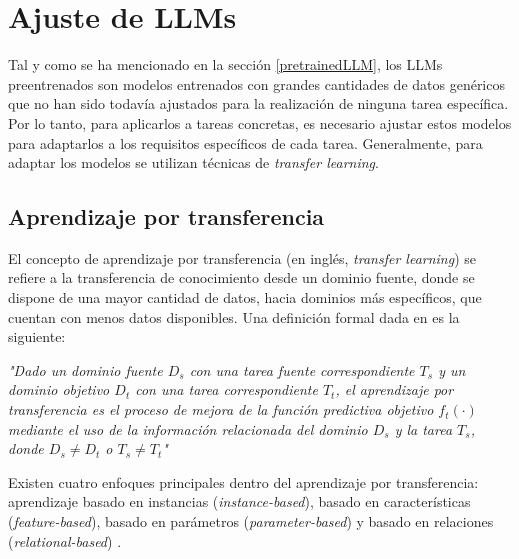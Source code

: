 \documentclass[11pt,spanish,listoffigures,listoftables]{tfgetsinf}
\begin{document}
\section{Ajuste de LLMs}

Tal y como se ha mencionado en la sección \ref{pretrainedLLM}, los LLMs preentrenados son modelos entrenados con grandes cantidades de datos genéricos que no han sido todavía ajustados para la realización de ninguna tarea específica. Por lo tanto, para aplicarlos a tareas concretas, es necesario ajustar estos modelos para adaptarlos a los requisitos específicos de cada tarea. Generalmente, para adaptar los modelos se utilizan técnicas de \textit{transfer learning}.

\subsection{Aprendizaje por transferencia}

El concepto de aprendizaje por transferencia (en inglés, \textit{transfer learning}) se refiere a la transferencia de conocimiento desde un dominio fuente, donde se dispone de una mayor cantidad de datos, hacia dominios más específicos, que cuentan con menos datos disponibles. Una definición formal dada en \cite{Weiss2016} es la siguiente:

\begin{displayquote}
\textit{"Dado un dominio fuente $D_s$ con una tarea fuente correspondiente $T_s$ y un dominio objetivo $D_t$ con una tarea correspondiente $T_t$, el aprendizaje por transferencia es el proceso de mejora de la función predictiva objetivo $f_t(\cdot)$ mediante el uso de la información relacionada del dominio $D_s$ y la tarea $T_s$, donde $D_s \neq D_t$ o $T_s \neq T_t$"}
\end{displayquote}

Existen cuatro enfoques principales dentro del aprendizaje por transferencia: aprendizaje basado en instancias (\textit{instance-based}), basado en características (\textit{feature-based}), basado en parámetros (\textit{parameter-based}) y basado en relaciones (\textit{relational-based}) \cite{Weiss2016}.
\end{document}
